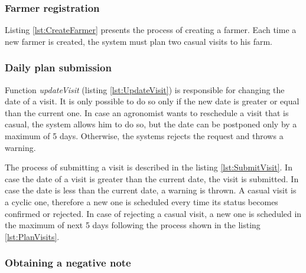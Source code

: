 

\subsubsection*{Farmer registration}

Listing \ref{lst:CreateFarmer} presents the process of creating a farmer. Each time a new farmer is created, the system must plan two casual visits to his farm.



\subsubsection*{Daily plan submission}

Function \textit{updateVisit} (listing \ref{lst:UpdateVisit}) is responsible for changing the date of a visit. It is only possible to do so only if the new date is greater or equal than the current one. In case an agronomist wants to reschedule a visit that is casual, the system allows him to do so, but the date can be postponed only by a maximum of 5 days. Otherwise, the systems rejects the request and throws a warning.



The process of submitting a visit is described in the listing \ref{lst:SubmitVisit}. In case the date of a visit is greater than the current date, the visit is submitted. In case the date is less than the current date, a warning is thrown. A casual visit is a cyclic one, therefore a new one is scheduled every time its status becomes confirmed or rejected. In case of rejecting a casual visit, a new one is scheduled in the maximum of next 5 days following the process shown in the listing \ref{lst:PlanVisits}.



\subsubsection*{Obtaining a negative note}

